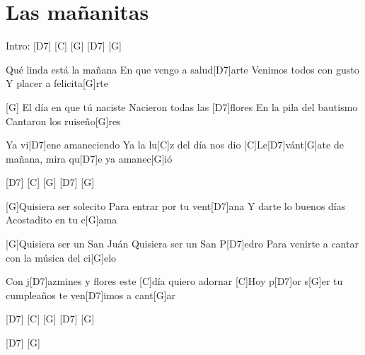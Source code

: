 \section{Las mañanitas}

\noindent
\chordDs
\chordC
\chordG

\vspace{1cm}

\begin{guitar}
	\begin{multicols}{2}
	
		Intro: \hspace{0.5cm} [D7] \hspace{0.5cm}[C] \hspace{0.5cm} [G] \hspace{0.5cm}[D7] \hspace{0.5cm} [G]
		
		\newline
		[G]Qué linda está la mañana
		En que vengo a salud[D7]arte
		Venimos todos con gusto
		Y placer a felicita[G]rte
		
		[G]
		El día en que tú naciste
		Nacieron todas las [D7]flores
		En la pila del bautismo
		Cantaron los ruiseño[G]res
		
		
		Ya vi[D7]ene amaneciendo
		Ya la lu[C]z del día nos dio
		[C]Le[D7]vánt[G]ate de mañana, mira qu[D7]e ya amanec[G]ió
			
		\vspace{0.1cm}
		
		[D7] \hspace{0.5cm}[C] \hspace{0.5cm} [G] \hspace{0.5cm}[D7] \hspace{0.5cm} [G]
		
		[G]Quisiera ser solecito
		Para entrar por tu vent[D7]ana
		Y darte lo buenos días
		Acostadito en tu c[G]ama
		
		[G]Quisiera ser un San Juán
		Quisiera ser un San P[D7]edro
		Para venirte a cantar 
		con la música del ci[G]elo
		
		Con j[D7]azmines y flores 
		este [C]día quiero adornar
		[C]Hoy p[D7]or s[G]er tu cumpleaños te ven[D7]imos a cant[G]ar
		
		\vspace{0.1cm}
		
		[D7] \hspace{0.5cm}[C] \hspace{0.5cm} [G] \hspace{0.5cm}[D7] \hspace{0.5cm} [G]
		
		[D7] \hspace{0.1cm}[G]

	\end{multicols}	
\end{guitar}

